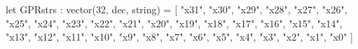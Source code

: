 let GPRstrs : vector(32, dec, string) = [ "x31", "x30", "x29", "x28", "x27", "x26", "x25", "x24", "x23", "x22", "x21",
  "x20", "x19", "x18", "x17", "x16", "x15", "x14", "x13", "x12", "x11",
  "x10", "x9", "x8", "x7", "x6", "x5", "x4", "x3", "x2", "x1", "x0"
  ]
